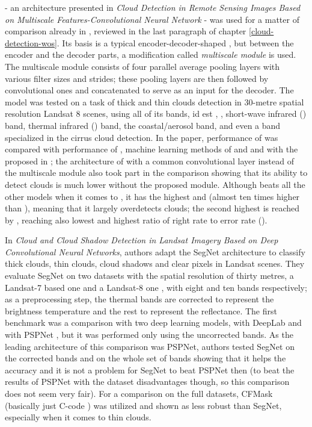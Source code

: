  - an architecture presented in \textit{Cloud Detection in Remote Sensing Images Based on Multiscale Features-Convolutional Neural Network} - was used for a matter of comparison already in \cite{bi-sad-cloud}, reviewed in the last paragraph of chapter \ref{cloud-detection-wos}. Its basis is a typical encoder-decoder-shaped , but between the encoder and the decoder parts, a modification called \textit{multiscale module} is used. The multiscale module consists of four parallel average pooling layers with various filter sizes and strides; these pooling layers are then followed by convolutional ones and concatenated to serve as an input for the decoder. The model was tested on a task of thick and thin clouds detection in 30-metre spatial resolution Landsat 8 scenes, using all of its bands, id est , , short-wave infrared () band, thermal infrared () band, the coastal/aerosol band, and even a band specialized in the cirrus cloud detection. In the paper, performance of  was compared with performance of  \cite{fmask}, machine learning methods of  \cite{svm} and  and with the  proposed in \cite{cloud-snow-cnn}; the architecture of  with a common convolutional layer instead of the multiscale module also took part in the comparison showing that its ability to detect clouds is much lower without the proposed module. Although  beats all the other models when it comes to , it has the highest  and  (almost ten times higher than ), meaning that it largely overdetects clouds; the second highest  is reached by , reaching also lowest  and highest ratio of right rate to error rate ().

In \textit{Cloud and Cloud Shadow Detection in Landsat Imagery Based on Deep Convolutional Neural Networks}, authors adapt the SegNet architecture \cite{segnet} to classify thick clouds, thin clouds, cloud shadows and clear pixels in Landsat scenes. They evaluate SegNet on two datasets with the spatial resolution of thirty metres, a Landsat-7 based one \cite{irish} and a Landsat-8 one \cite{biome}, with eight and ten bands respectively; as a preprocessing step, the thermal bands are corrected to represent the brightness temperature and the rest to represent the  reflectance. The first benchmark was a comparison with two deep learning models, with DeepLab \cite{deeplab} and with PSPNet \cite{pspnet}, but it was performed only using the uncorrected  bands. As the leading architecture of this comparison was PSPNet, authors tested SegNet on the corrected bands and on the whole set of bands showing that it helps the accuracy and it is not a problem for SegNet to beat PSPNet then (to beat the results of PSPNet with the dataset disadvantages though, so this comparison does not seem very fair). For a comparison on the full datasets, CFMask (basically just C-code ) was utilized and shown as less robust than SegNet, especially when it comes to thin clouds.

